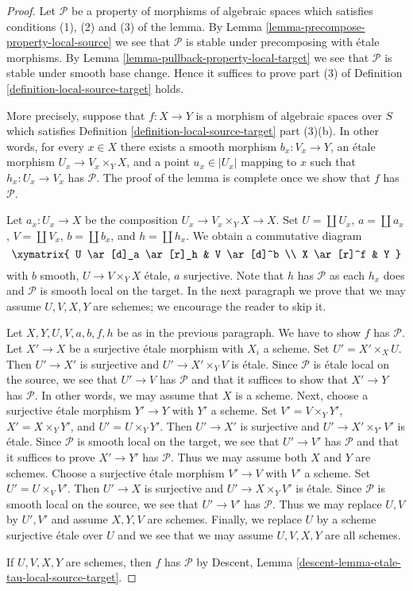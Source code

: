 \begin{proof}
Let $\mathcal{P}$ be a property of morphisms of algebraic spaces which
satisfies conditions (1), (2) and (3) of the lemma. By
Lemma \ref{lemma-precompose-property-local-source}
we see that $\mathcal{P}$ is stable under precomposing with
\'etale morphisms. By
Lemma \ref{lemma-pullback-property-local-target}
we see that $\mathcal{P}$ is stable under smooth base change.
Hence it suffices to prove part (3) of
Definition \ref{definition-local-source-target}
holds.

\medskip\noindent
More precisely, suppose that $f : X \to Y$ is a morphism
of algebraic spaces over $S$ which satisfies
Definition \ref{definition-local-source-target} part (3)(b).
In other words, for every $x \in X$ there exists
a smooth morphism $b_x : V_x \to Y$,
an \'etale morphism $U_x \to V_x \times_Y X$, and
a point $u_x \in |U_x|$ mapping to $x$
such that $h_x : U_x \to V_x$ has $\mathcal{P}$.
The proof of the lemma is complete once we show that $f$ has $\mathcal{P}$.

\medskip\noindent
Let $a_x : U_x \to X$ be the composition $U_x \to V_x \times_Y X \to X$.
Set $U = \coprod U_x$, $a = \coprod a_x$, $V = \coprod V_x$,
$b = \coprod b_x$, and $h = \coprod h_x$. We obtain a
commutative diagram
$$
\xymatrix{
U \ar[d]_a \ar[r]_h & V \ar[d]^b \\
X \ar[r]^f & Y
}
$$
with $b$ smooth, $U \to V \times_Y X$ \'etale, $a$ surjective.
Note that $h$ has $\mathcal{P}$ as each $h_x$ does and $\mathcal{P}$
is smooth local on the target. In the next paragraph we prove
that we may assume $U, V, X, Y$ are schemes; we encourage the reader
to skip it.

\medskip\noindent
Let $X, Y, U, V, a, b, f, h$ be as in the previous paragraph. We have
to show $f$ has $\mathcal{P}$. Let $X' \to X$ be a surjective \'etale
morphism with $X_i$ a scheme. Set $U' = X' \times_X U$. Then
$U' \to X'$ is surjective and $U' \to X' \times_Y V$ is \'etale.
Since $\mathcal{P}$ is \'etale local on the source, we see that
$U' \to V$ has $\mathcal{P}$ and that it suffices to show that
$X' \to Y$ has $\mathcal{P}$. In other words, we may assume
that $X$ is a scheme. Next, choose a surjective \'etale morphism
$Y' \to Y$ with $Y'$ a scheme. Set $V' = V \times_Y Y'$,
$X' = X \times_Y Y'$, and $U' = U \times_Y Y'$. Then
$U' \to X'$ is surjective and $U' \to X' \times_{Y'} V'$ is \'etale.
Since $\mathcal{P}$ is smooth local on the target, we see that $U' \to V'$ has
$\mathcal{P}$ and that it suffices to prove $X' \to Y'$ has $\mathcal{P}$.
Thus we may assume both $X$ and $Y$ are schemes.
Choose a surjective \'etale morphism $V' \to V$
with $V'$ a scheme. Set $U' = U \times_V V'$.
Then $U' \to X$ is surjective and $U' \to X \times_Y V'$ is \'etale.
Since $\mathcal{P}$ is smooth local on the source, we see that
$U' \to V'$ has $\mathcal{P}$. Thus we may replace $U, V$ by
$U', V'$ and assume $X, Y, V$ are schemes.
Finally, we replace $U$ by a scheme surjective \'etale over $U$
and we see that we may assume $U, V, X, Y$ are all schemes.

\medskip\noindent
If $U, V, X, Y$ are schemes, then $f$ has $\mathcal{P}$
by Descent, Lemma \ref{descent-lemma-etale-tau-local-source-target}.
\end{proof}


